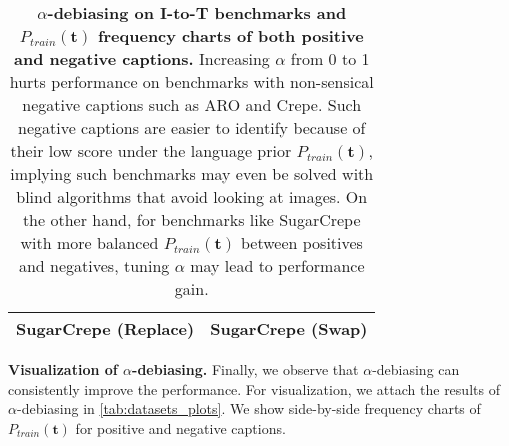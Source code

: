 \documentclass{article} \usepackage{iclr2024_conference,times}
\begin{document}
\begin{table}[h]
{\begin{tabular}{cc|cc}
\multicolumn{2}{c}{SugarCrepe (Replace)} & \multicolumn{2}{c}{SugarCrepe (Swap)} \\
\bottomrule
\end{tabular}
}
\caption{\small {\bf $\alpha$-debiasing on I-to-T benchmarks and $P_{train}(\mathbf{t})$ frequency charts of both positive and negative captions.} Increasing $\alpha$ from 0 to 1 hurts performance
on benchmarks with non-sensical negative captions such as ARO and Crepe. Such negative captions are easier to identify because of their low score under the language prior  $P_{train}(\mathbf{t})$, implying such benchmarks may even be solved with blind algorithms that avoid looking at images. On the other hand, for benchmarks like SugarCrepe with more balanced $P_{train}(\mathbf{t})$ between positives and negatives, tuning $\alpha$ may lead to performance gain.
}
\label{tab:datasets_plots}
\end{table}

{\bf Visualization of $\alpha$-debiasing.} Finally, we observe that $\alpha$-debiasing can consistently improve the performance. For visualization, we attach the results of $\alpha$-debiasing in \autoref{tab:datasets_plots}. We show side-by-side frequency charts of $P_{train}(\mathbf{t})$ for positive and negative captions. 
\end{document}
